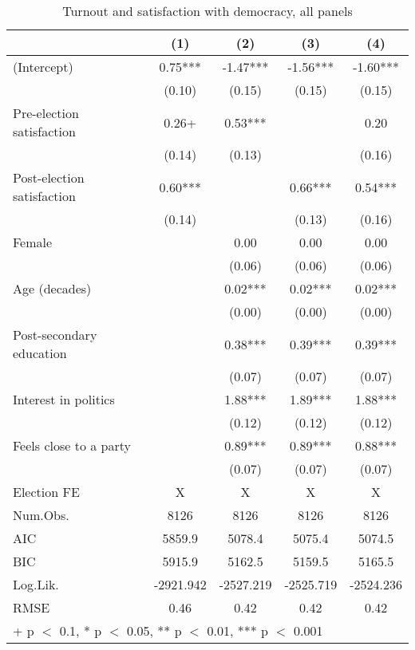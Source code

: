 \begin{table}

\caption{\label{tab:unnamed-chunk-5}Turnout and satisfaction with democracy, all panels}
\centering
\begin{tabular}[t]{lcccc}
\toprule
  & (1) & (2) & (3) & (4)\\
\midrule
(Intercept) & 0.75*** & -1.47*** & -1.56*** & -1.60***\\
 & (0.10) & (0.15) & (0.15) & (0.15)\\
Pre-election satisfaction & 0.26+ & 0.53*** &  & 0.20\\
 & (0.14) & (0.13) &  & (0.16)\\
Post-election satisfaction & 0.60*** &  & 0.66*** & 0.54***\\
 & (0.14) &  & (0.13) & (0.16)\\
Female &  & 0.00 & 0.00 & 0.00\\
 &  & (0.06) & (0.06) & (0.06)\\
Age (decades) &  & 0.02*** & 0.02*** & 0.02***\\
 &  & (0.00) & (0.00) & (0.00)\\
Post-secondary education &  & 0.38*** & 0.39*** & 0.39***\\
 &  & (0.07) & (0.07) & \vphantom{1} (0.07)\\
Interest in politics &  & 1.88*** & 1.89*** & 1.88***\\
 &  & (0.12) & (0.12) & (0.12)\\
Feels close to a party &  & 0.89*** & 0.89*** & 0.88***\\
 &  & (0.07) & (0.07) & (0.07)\\
\midrule
Election FE & X & X & X & X\\
Num.Obs. & 8126 & 8126 & 8126 & 8126\\
AIC & 5859.9 & 5078.4 & 5075.4 & 5074.5\\
BIC & 5915.9 & 5162.5 & 5159.5 & 5165.5\\
Log.Lik. & -2921.942 & -2527.219 & -2525.719 & -2524.236\\
RMSE & 0.46 & 0.42 & 0.42 & 0.42\\
\bottomrule
\multicolumn{5}{l}{\rule{0pt}{1em}+ p $<$ 0.1, * p $<$ 0.05, ** p $<$ 0.01, *** p $<$ 0.001}\\
\end{tabular}
\end{table}
